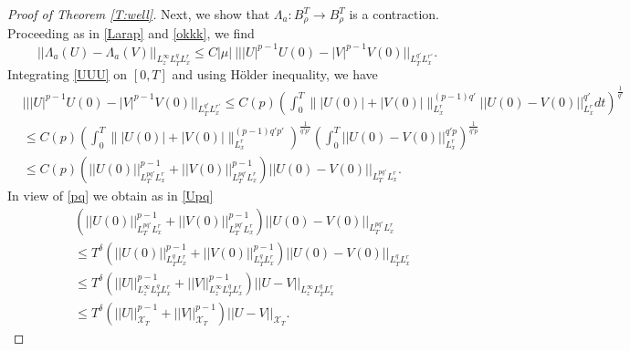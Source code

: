 \documentclass[11pt,letter]{amsart}
\numberwithin{equation}{section}
\newcommand{\XT}{\mathcal{X}_T}
\numberwithin{equation}{section}
\begin{document}
\begin{proof}[Proof of Theorem \ref{T:well}]
Next, we show that $\Lambda_a: B^T_\rho\to B^T_\rho$ is a contraction. Proceeding as in \eqref{Larap} and \eqref{okkk}, we find
\begin{equation}\label{okkk2}
||\Lambda_a(U) - \Lambda_a(V)||_{L^\infty_{z} L^q_T L^r_x } \le C |\mu| \ |||U|^{p-1} U(0) - |V|^{p-1} V(0)||_{L^{q'}_T L^{r'}_x}.
\end{equation}
Integrating \eqref{UUU} on $[0,T]$ and using H\"older inequality, we have
\begin{align*}
& |||U|^{p-1} U(0) - |V|^{p-1} V(0)||_{L^{q'}_T L^{r'}_x} \le C(p) \left(\int_0^T \big\||U(0)| + |V(0)|\big\|^{(p-1)q'}_{L^{r}_x} ||U(0) - V(0)||^{q'}_{L^{r}_x} dt\right)^{\frac{1}{q'}}
\\
& \le C(p) \left(\int_0^T \big\||U(0)| + |V(0)|\big\|^{(p-1)q' p'}_{L^{r}_x}\right)^{\frac{1}{q'p'}} \left(\int_0^T ||U(0) - V(0)||^{q' p}_{L^{r}_x}\right)^{\frac{1}{q'p}}
\\
& \le C(p) \left(||U(0)||^{p-1}_{L^{pq'}_T L^{r}_x} + ||V(0)||^{p-1}_{L^{pq'}_T L^{r}_x}\right) ||U(0) - V(0)||_{L^{pq'}_T L^{r}_x}.
\end{align*}
In view of \eqref{pq} we obtain as in \eqref{Upq}
\begin{align*}
& \left(||U(0)||^{p-1}_{L^{pq'}_T L^{r}_x} + ||V(0)||^{p-1}_{L^{pq'}_T L^{r}_x}\right) ||U(0) - V(0)||_{L^{pq'}_T L^{r}_x} 
\\
& \le T^{\delta} \left(||U(0)||^{p-1}_{L^{q}_T L^{r}_x} + ||V(0)||^{p-1}_{L^{q}_T L^{r}_x}\right) ||U(0) - V(0)||_{L^{q}_T L^{r}_x}
\\
& \le T^{\delta} \left(||U||^{p-1}_{L^\infty_z L^{q}_T L^{r}_x} + ||V||^{p-1}_{L^\infty_z L^{q}_T L^{r}_x}\right) ||U - V||_{L^\infty_z L^{q}_T L^{r}_x}
\\
& \le T^{\delta} \left(||U||^{p-1}_{\XT} + ||V||^{p-1}_{\XT}\right) ||U - V||_{\XT}.
\end{align*}


\end{proof}
\end{document}
